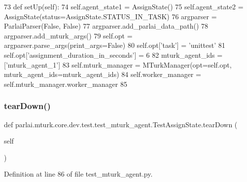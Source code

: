 \begin{DoxyCode}
73     \textcolor{keyword}{def }setUp(self):
74         self.agent\_state1 = AssignState()
75         self.agent\_state2 = AssignState(status=AssignState.STATUS\_IN\_TASK)
76         argparser = ParlaiParser(\textcolor{keyword}{False}, \textcolor{keyword}{False})
77         argparser.add\_parlai\_data\_path()
78         argparser.add\_mturk\_args()
79         self.opt = argparser.parse\_args(print\_args=\textcolor{keyword}{False})
80         self.opt[\textcolor{stringliteral}{'task'}] = \textcolor{stringliteral}{'unittest'}
81         self.opt[\textcolor{stringliteral}{'assignment\_duration\_in\_seconds'}] = 6
82         mturk\_agent\_ids = [\textcolor{stringliteral}{'mturk\_agent\_1'}]
83         self.mturk\_manager = MTurkManager(opt=self.opt, mturk\_agent\_ids=mturk\_agent\_ids)
84         self.worker\_manager = self.mturk\_manager.worker\_manager
85 
\end{DoxyCode}
\mbox{\label{classparlai_1_1mturk_1_1core_1_1dev_1_1test_1_1test__mturk__agent_1_1TestAssignState_af963ff49ad493a18530891227066e549}} 
\subsubsection{\texorpdfstring{tear\+Down()}{tearDown()}}
{\footnotesize\ttfamily def parlai.\+mturk.\+core.\+dev.\+test.\+test\+\_\+mturk\+\_\+agent.\+Test\+Assign\+State.\+tear\+Down (\begin{DoxyParamCaption}\item[{}]{self }\end{DoxyParamCaption})}



Definition at line 86 of file test\+\_\+mturk\+\_\+agent.\+py.



